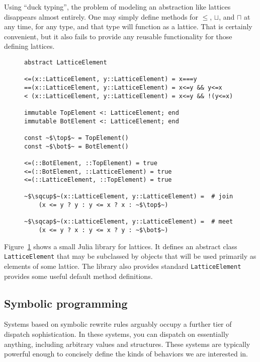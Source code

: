 Using ``duck typing'', the problem of modeling an abstraction like lattices
disappears almost entirely. One may simply define methods for
$\leq$, $\sqcup$, and $\sqcap$ at any time, for any type, and that type will
function as a lattice. That is certainly convenient, but it also fails to
provide any reusable functionality for those defining lattices.

\begin{figure}
  \begin{center}
\begin{singlespace}
\begin{lstlisting}[style=customjulia]
abstract LatticeElement

<=(x::LatticeElement, y::LatticeElement) = x===y
==(x::LatticeElement, y::LatticeElement) = x<=y && y<=x
< (x::LatticeElement, y::LatticeElement) = x<=y && !(y<=x)

immutable TopElement <: LatticeElement; end
immutable BotElement <: LatticeElement; end

const ~$\top$~ = TopElement()
const ~$\bot$~ = BotElement()

<=(::BotElement, ::TopElement) = true
<=(::BotElement, ::LatticeElement) = true
<=(::LatticeElement, ::TopElement) = true

~$\sqcup$~(x::LatticeElement, y::LatticeElement) =  # join
    (x <= y ? y : y <= x ? x : ~$\top$~)

~$\sqcap$~(x::LatticeElement, y::LatticeElement) =  # meet
    (x <= y ? x : y <= x ? y : ~$\bot$~)
\end{lstlisting}
\end{singlespace}
  \end{center}
  \label{julialattices}
\end{figure}

Figure~\ref{julialattices} shows a small Julia library for lattices.
It defines an abstract class \texttt{LatticeElement} that may be subclassed
by objects that will be used primarily as elements of some lattice.
The library also provides standard
\texttt{LatticeElement} provides some useful default method definitions.


\subsection{Symbolic programming}

Systems based on symbolic rewrite rules arguably occupy a further tier of
dispatch sophistication. In these systems, you can dispatch on essentially
anything, including arbitrary values and structures. These systems are
typically powerful enough to concisely define the kinds of behaviors we
are interested in.

